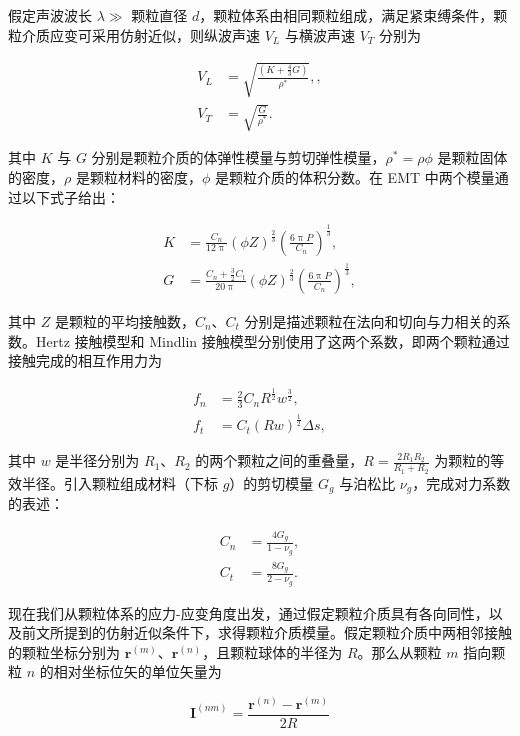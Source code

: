 假定声波波长 $\lambda\gg$ 颗粒直径 $d$，颗粒体系由相同颗粒组成，满足紧束缚条件，颗粒介质应变可采用仿射近似，则纵波声速 $V_{L}$ 与横波声速 $V_{T}$ 分别为

\begin{align}
  V_{L} &= \sqrt{\frac{(K+\frac{4}{3}G)}{\rho^{*}}},\label{eq:emt_velocity_L},\\
  V_{T} &= \sqrt{\frac{G}{\rho^{*}}}.\label{eq:emt_velocity_T}
\end{align}

其中 $K$ 与 $G$ 分别是颗粒介质的体弹性模量与剪切弹性模量，$\rho^{*}=\rho\phi$ 是颗粒固体的密度，$\rho$ 是颗粒材料的密度，$\phi$ 是颗粒介质的体积分数。在 EMT 中两个模量通过以下式子给出：

\begin{align}
  K &= \frac{C_{n}}{12\uppi}\left(\phi Z\right)^{\frac{2}{3}}\left(\frac{6\uppi P}{C_{n}}\right)^{\frac{1}{3}},\\
  G &= \frac{C_{n} + \frac{3}{2}C_{t}}{20\uppi}\left(\phi Z\right)^{\frac{2}{3}}\left(\frac{6\uppi P}{C_{n}}\right)^{\frac{1}{3}},
\end{align}

其中 $Z$ 是颗粒的平均接触数，$C_{n}$、$C_{t}$ 分别是描述颗粒在法向和切向与力相关的系数。Hertz 接触模型和 Mindlin 接触模型分别使用了这两个系数，即两个颗粒通过接触完成的相互作用力为

\begin{align}
  f_{n} &= \frac{2}{3}C_{n}R^{\frac{1}{2}}w^{\frac{3}{2}},\\
  f_{t} &= C_{t}(Rw)^{\frac{1}{2}}\Delta s,
\end{align}

其中 $w$ 是半径分别为 $R_{1}$、$R_{2}$ 的两个颗粒之间的重叠量，$R = \frac{2R_{1}R_{2}}{R_{1} + R_{2}}$ 为颗粒的等效半径。引入颗粒组成材料（下标 $g$）的剪切模量 $G_{g}$ 与泊松比 $\nu_{g}$，完成对力系数的表述：

\begin{align}
  C_{n} &= \frac{4G_{g}}{1-\nu_{g}},\\
  C_{t} &= \frac{8G_{g}}{2-\nu_{g}}.
\end{align}

现在我们从颗粒体系的应力-应变角度出发，通过假定颗粒介质具有各向同性，以及前文所提到的仿射近似条件下，求得颗粒介质模量\cite{WALTON1987213}。假定颗粒介质中两相邻接触的颗粒坐标分别为 $\mathbf{r}^{(m)}$、$\mathbf{r}^{(n)}$，且颗粒球体的半径为 $R$。那么从颗粒 $m$ 指向颗粒 $n$ 的相对坐标位矢的单位矢量为

\begin{equation}
  \mathbf{I}^{(nm)} = \frac{\mathbf{r}^{(n)} - \mathbf{r}^{(m)}}{2R}\label{eq:unit_vector}
\end{equation}

